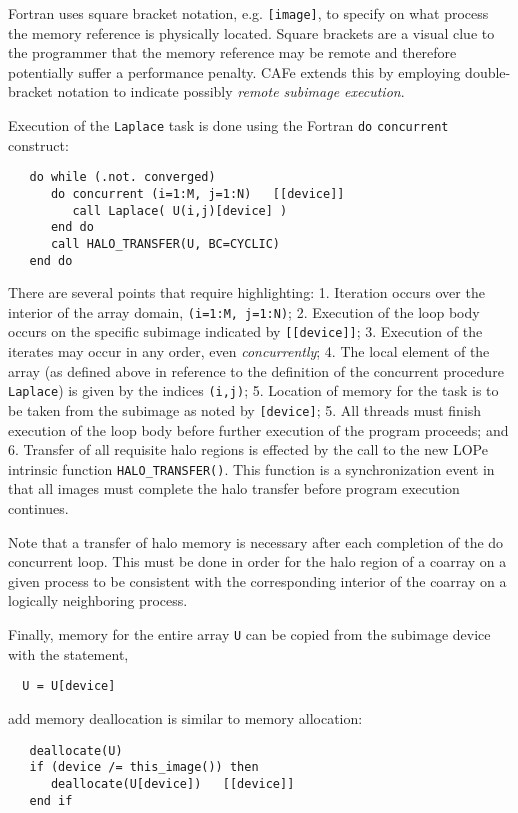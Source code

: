 Fortran uses square bracket notation, e.g. \texttt{[image]}, to specify on what process the
memory reference is physically located.  Square brackets are a visual clue to the
programmer that the memory reference may be remote and therefore potentially suffer a
performance penalty.  CAFe extends this by employing double-bracket notation to indicate
possibly \emph{remote subimage execution}.

Execution of the \texttt{Laplace} task is done using the Fortran \texttt{do}
\texttt{concurrent} construct:
\begin{verbatim}
   do while (.not. converged)
      do concurrent (i=1:M, j=1:N)   [[device]]
         call Laplace( U(i,j)[device] )
      end do
      call HALO_TRANSFER(U, BC=CYCLIC)
   end do
\end{verbatim}
There are several points that require highlighting: 1. Iteration occurs over the interior
of the array domain, \texttt{(i=1:M, j=1:N)}; 2. Execution of the loop body occurs on the
specific subimage indicated by \texttt{[[device]]}; 3. Execution of the iterates may occur
in any order, even \emph{concurrently}; 4. The local element of the array (as
defined above in reference to the definition of the concurrent procedure
\texttt{Laplace}) is given by the indices \texttt{(i,j)}; 5. Location of memory for the
task is to be taken from the subimage as noted by \texttt{[device]}; 5. All threads must finish
execution of the loop body before further execution of the program proceeds; and 6. Transfer of
all requisite halo regions is effected by the call to the new LOPe intrinsic function
\texttt{HALO\_TRANSFER()}.  This function is a synchronization event in that all images must
complete the halo transfer before program execution continues.

Note that a transfer of halo memory is necessary after each completion of the do concurrent loop.
This must be done in order for the halo region of a coarray on a given process to be consistent
with the corresponding interior of the coarray on a logically neighboring process.


Finally, memory for the entire array \texttt{U} can be copied from the subimage device
with the statement,
\begin{verbatim}
  U = U[device]
\end{verbatim}
add memory deallocation is similar to memory allocation:
\begin{verbatim}
   deallocate(U)
   if (device /= this_image()) then
      deallocate(U[device])   [[device]]
   end if
\end{verbatim}


